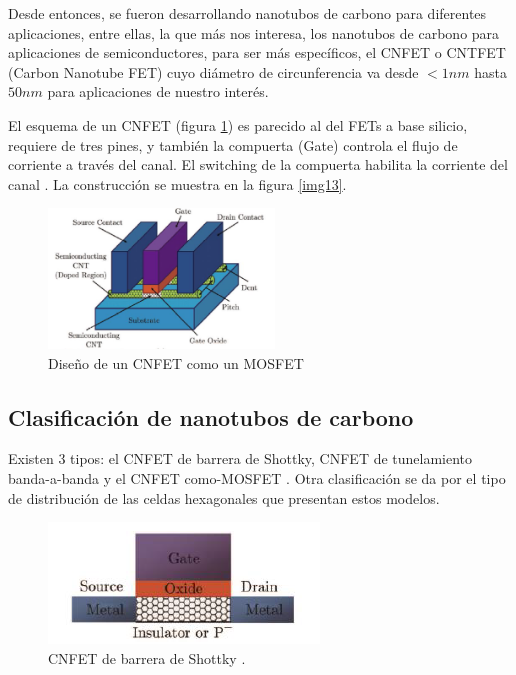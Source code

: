 \documentclass[conference]{IEEEtran} %
\begin{document}
Desde entonces, se fueron desarrollando nanotubos de carbono para diferentes aplicaciones, entre ellas, la que más nos interesa, los nanotubos de carbono para aplicaciones de semiconductores, para ser más específicos, el CNFET o CNTFET (Carbon Nanotube FET) cuyo diámetro de circunferencia va desde $<1nm$ hasta $50nm$ \cite{DesignandSimulationofCarbon2021} para aplicaciones de nuestro interés.

El esquema de un CNFET (figura \ref{img11}) es parecido al del FETs a base silicio, requiere de tres pines, y también la compuerta (Gate) controla el flujo de corriente a través del canal. El switching de la compuerta habilita  la corriente del canal \cite{PerformanceAnalysisofClassical2018}. La construcción se muestra en la figura \ref{img13}. 

\begin{figure}
	\centering
	\includegraphics[width=6cm]{IMAGENES/img11}
	\caption{Diseño de un CNFET como un MOSFET \cite{DesignofanovelternarySRAM2017}}
	\label{img11}
\end{figure}




\subsection{Clasificación de nanotubos de carbono}
Existen 3 tipos: el CNFET de barrera de Shottky, CNFET de tunelamiento banda-a-banda y el CNFET como-MOSFET \cite{DesignofanovelternarySRAM2017}. Otra clasificación se da por el tipo de distribución de las celdas hexagonales que presentan estos modelos.

\begin{figure}
	\centering
	\includegraphics[scale=0.7]{IMAGENES/img16}
	\caption{CNFET de barrera de Shottky \cite{DesignofanovelternarySRAM2017}.}
	\label{img16}
\end{figure}
\end{document}
